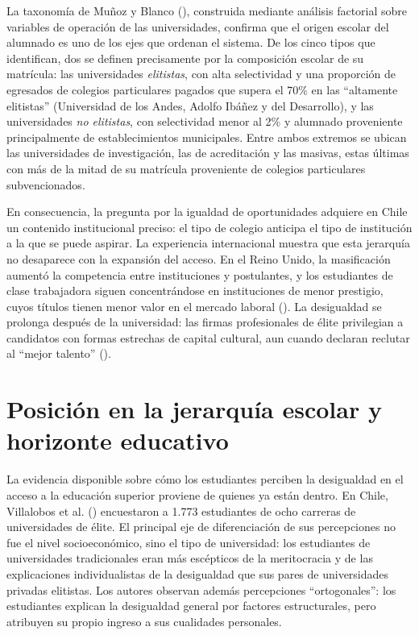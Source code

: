 \documentclass[
  spanish,
  a4paper,
  oneside]{scrbook}
\begin{document}
La taxonomía de Muñoz y Blanco
(), construida mediante
análisis factorial sobre variables de operación de las universidades,
confirma que el origen escolar del alumnado es uno de los ejes que
ordenan el sistema. De los cinco tipos que identifican, dos se definen
precisamente por la composición escolar de su matrícula: las
universidades \emph{elitistas}, con alta selectividad y una proporción
de egresados de colegios particulares pagados que supera el 70\% en las
``altamente elitistas'' (Universidad de los Andes, Adolfo Ibáñez y del
Desarrollo), y las universidades \emph{no elitistas}, con selectividad
menor al 2\% y alumnado proveniente principalmente de establecimientos
municipales. Entre ambos extremos se ubican las universidades de
investigación, las de acreditación y las masivas, estas últimas con más
de la mitad de su matrícula proveniente de colegios particulares
subvencionados.

En consecuencia, la pregunta por la igualdad de oportunidades adquiere
en Chile un contenido institucional preciso: el tipo de colegio anticipa
el tipo de institución a la que se puede aspirar. La experiencia
internacional muestra que esta jerarquía no desaparece con la expansión
del acceso. En el Reino Unido, la masificación aumentó la competencia
entre instituciones y postulantes, y los estudiantes de clase
trabajadora siguen concentrándose en instituciones de menor prestigio,
cuyos títulos tienen menor valor en el mercado laboral
(). La
desigualdad se prolonga después de la universidad: las firmas
profesionales de élite privilegian a candidatos con formas estrechas de
capital cultural, aun cuando declaran reclutar al ``mejor talento''
().

\section{Posición en la jerarquía escolar y horizonte
educativo}\label{posiciuxf3n-en-la-jerarquuxeda-escolar-y-horizonte-educativo}

La evidencia disponible sobre cómo los estudiantes perciben la
desigualdad en el acceso a la educación superior proviene de quienes ya
están dentro. En Chile, Villalobos et al.
() encuestaron a 1.773
estudiantes de ocho carreras de universidades de élite. El principal eje
de diferenciación de sus percepciones no fue el nivel socioeconómico,
sino el tipo de universidad: los estudiantes de universidades
tradicionales eran más escépticos de la meritocracia y de las
explicaciones individualistas de la desigualdad que sus pares de
universidades privadas elitistas. Los autores observan además
percepciones ``ortogonales'': los estudiantes explican la desigualdad
general por factores estructurales, pero atribuyen su propio ingreso a
sus cualidades personales.
\end{document}

